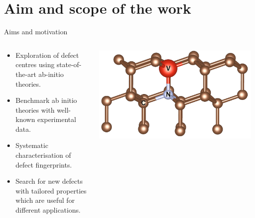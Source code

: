\documentclass[notes=hide]{beamer}
\begin{document}
\section{Aim and scope of the work} %
\begin{frame}{Aims and motivation}

  \begin{columns}
    \begin{column}{0.5\textwidth}
      \begin{itemize}

        \item
          Exploration of defect centres using state-of-the-art ab-initio
          theories.

        \item
          Benchmark ab initio theories with well-known
          experimental data.

        \item
          Systematic characterisation of defect fingerprints.

        \item
          Search for new defects with tailored properties which are useful
          for different applications.


      \end{itemize}
    \end{column}
    \begin{column}{0.5\textwidth}
      \begin{center}
        \includegraphics[width=1\textwidth]{images/POSCAR_16_view.png}
      \end{center}
    \end{column}
  \end{columns}


\end{frame}
\end{document}
